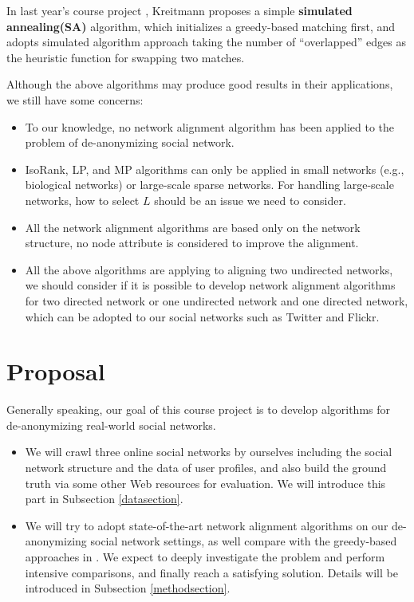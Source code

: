 \documentclass[11pt,letterpaper]{article}
\begin{document}
In last year's course project \cite{Kreitmann2011}, Kreitmann proposes a simple \textbf{simulated annealing(SA)} algorithm, which initializes a greedy-based matching first, and adopts simulated algorithm approach taking the number of ``overlapped'' edges as the heuristic function for swapping two matches. 

Although the above algorithms may produce good results in their applications, we still have some concerns:
\begin{itemize}
	\item
		To our knowledge, no network alignment algorithm has been applied to the problem of de-anonymizing social network.
	\item
		IsoRank, LP, and MP algorithms can only be applied in small networks (e.g., biological networks) or large-scale sparse networks. For handling large-scale networks, how to select $L$ should be an issue we need to consider. 
	\item
		All the network alignment algorithms are based only on the network structure, no node attribute is considered to improve the alignment. 
	\item
		All the above algorithms are applying to aligning two undirected networks, we should consider if it is possible to develop network alignment algorithms for two directed network or one undirected network and one directed network, which can be adopted to our social networks such as Twitter and Flickr. 
\end{itemize}


\section{Proposal}

Generally speaking, our goal of this course project is to develop algorithms for de-anonymizing real-world social networks. 
\begin{itemize}
	\item
		We will crawl three online social networks by ourselves including the social network structure and the data of user profiles, and also build the ground truth via some other Web resources for evaluation. We will introduce this part in Subsection \ref{datasection}.
	\item
		We will try to adopt state-of-the-art network alignment algorithms on our de-anonymizing social network settings, as well compare with the greedy-based approaches in \cite{Narayanan2009}. We expect to deeply investigate the problem and perform intensive comparisons, and finally reach a satisfying solution. Details will be introduced in Subsection \ref{methodsection}.
\end{itemize}
\end{document}
